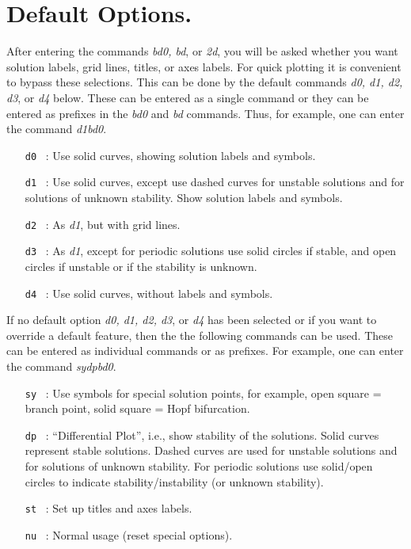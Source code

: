\documentclass[12pt]{report}
\begin{document}
\section{ Default Options.} \label{sec:PLAUT_default}
After entering the commands {\it bd0, bd}, or {\it 2d}, you will be asked whether you 
want solution labels, grid lines, titles, or axes labels.
For quick plotting it is convenient to bypass these selections.
This can be done by the default commands {\it d0, d1, d2, d3}, or {\it d4} below.
These can be entered as a single command 
or they can be entered as prefixes in the {\it bd0} and {\it bd} commands. 
Thus, for example, one can enter the command {\it d1bd0}.  

\begin{itemize}
\item[\tt d0]~:  Use solid curves, showing solution labels and symbols.  
\item[\tt d1]~:  Use solid curves, except use dashed curves for unstable
  solutions and for solutions of unknown stability.
  Show solution labels and symbols.
\item[\tt d2]~:  As {\it d1}, but with grid lines.  
\item[\tt d3]~:  As {\it d1}, except for periodic solutions use 
  solid circles if stable,
  and open circles if unstable or if the stability
  is unknown.
\item[\tt d4]~:  Use solid curves, without labels and symbols.  
\end{itemize}

If no default option {\it d0, d1, d2, d3}, or {\it d4} has been selected 
or if you want to override a default feature,
then the the following commands can be used.
These can be entered as individual commands or as prefixes.
For example, one can enter the command {\it sydpbd0}.

\begin{itemize}
\item[\tt sy]~:  Use symbols for special solution points, for example,
  open square = branch point,
  solid square = Hopf bifurcation.
\item[\tt dp]~:  ``Differential Plot'', i.e., show stability of the 
  solutions. Solid curves represent stable solutions.
  Dashed curves are used for unstable
  solutions and for solutions of unknown stability.
  For periodic solutions use solid/open circles
  to indicate stability/instability (or unknown
  stability).
\item[\tt st]~:  Set up titles and axes labels. 
\item[\tt nu]~:  Normal usage (reset special options). 
\end{itemize}
\end{document}
